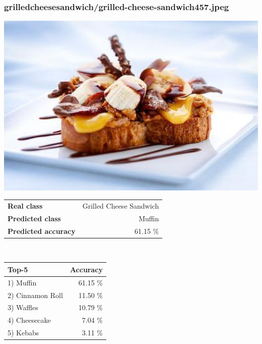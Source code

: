 \subsubsection{grilled\textunderscore cheese\textunderscore sandwich/grilled-cheese-sandwich457.jpeg}

\begin{minipage}[t]{0.4\textwidth}
	\vspace{0pt}
	\includegraphics[width=\linewidth]{images/evaluation-images/grilled_cheese_sandwich/grilled-cheese-sandwich457.jpeg}
\end{minipage}
\hfill
\begin{minipage}[t]{0.5\textwidth}
	\vspace{0pt}\raggedright
	\begin{tabularx}{\textwidth}{X r}
		\small \textbf{Real class} & \small Grilled Cheese Sandwich\\
		\small \textbf{Predicted class} & \small Muffin\\
		\small \textbf{Predicted accuracy} & \small 61.15 \%
    \end{tabularx}\\
    
    \vspace{6pt}
	\begin{tabularx}{\textwidth}{X r}
        \small \textbf{Top-5} & \small \textbf{Accuracy} \\
        \hline
		\small 1) Muffin & \small 61.15 \%\\\small 2) Cinnamon Roll & \small 11.50 \%\\\small 3) Waffles & \small 10.79 \%\\\small 4) Cheesecake & \small 7.04 \%\\\small 5) Kebabs & \small 3.11 \%
    \end{tabularx}
\end{minipage}
    
